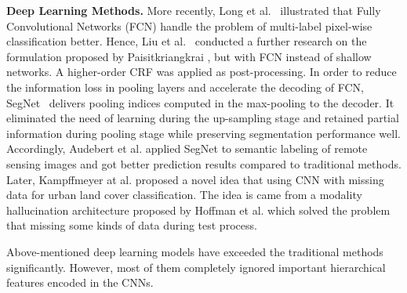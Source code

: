 \noindent\textbf{Deep Learning Methods.} More recently, Long et al.~\cite{IEEEexample:Long_2015_CVPR} illustrated that Fully Convolutional Networks (FCN) handle the problem of multi-label pixel-wise classification better.
Hence, Liu et al.~\cite{IEEEexample:liu2017dense} conducted a further research on the formulation proposed by Paisitkriangkrai \cite{IEEEexample:paisitkriangkrai2015effective}, but with FCN instead of shallow networks.
A higher-order CRF was applied as post-processing.
In order to reduce the information loss in pooling layers and accelerate the decoding of FCN, SegNet~\cite{IEEEexample:badrinarayanan2017segnet} delivers pooling indices  computed in the max-pooling to the decoder.
It eliminated the need of learning during the up-sampling stage and retained partial information during pooling stage while preserving segmentation performance well. 
%
Accordingly, Audebert et al. \cite{IEEEexample:audebert2017deep} applied SegNet  to semantic labeling of remote sensing images and got better prediction results compared to traditional methods.
Later, Kampffmeyer at al. \cite{IEEEexample:kampffmeyer2017urban} proposed a novel idea that using CNN with missing data for urban land cover classification.
The idea is came from a modality hallucination architecture proposed by Hoffman et al. \cite{IEEEexample:hoffman2016learning} which solved the problem that missing some kinds of data during test process.


Above-mentioned deep learning models have exceeded the traditional methods significantly.
However, most of them completely ignored important hierarchical features encoded in the CNNs. 
%



